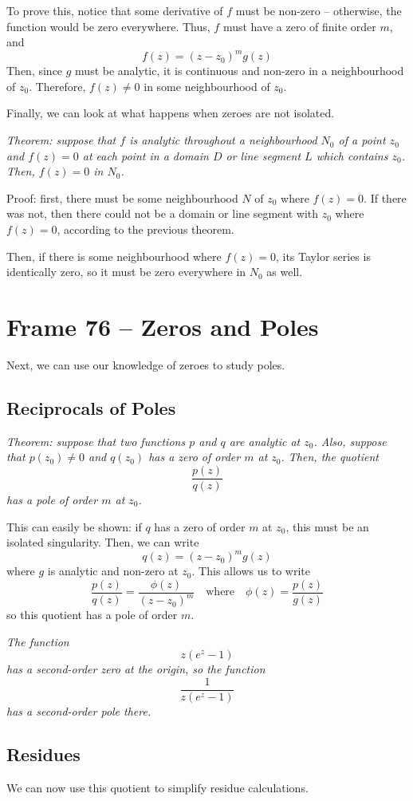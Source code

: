 \documentclass{article}
\begin{document}
To prove this, notice that some derivative of $f$ must be non-zero -- otherwise, the function would be zero everywhere. Thus, $f$ must have a zero of finite order $m$, and
\[	
	f(z) = (z - z_0)^m g(z)
\]
Then, since $g$ must be analytic, it is continuous and non-zero in a neighbourhood of $z_0$. Therefore, $f(z) \neq 0$ in some neighbourhood of $z_0$.

Finally, we can look at what happens when zeroes are not isolated.

\textit{Theorem: suppose that $f$ is analytic throughout a neighbourhood $N_0$ of a point $z_0$ and $f(z) = 0$ at each point in a domain $D$ or line segment $L$ which contains $z_0$. Then, $f(z) = 0$ in $N_0$.}

Proof: first, there must be some neighbourhood $N$ of $z_0$ where $f(z) = 0$. If there was not, then there could not be a domain or line segment with $z_0$ where $f(z) = 0$, according to the previous theorem.

Then, if there is some neighbourhood where $f(z) = 0$, its Taylor series is identically zero, so it must be zero everywhere in $N_0$ as well.


\clearpage
\section{Frame 76 -- Zeros and Poles}
Next, we can use our knowledge of zeroes to study poles.

\subsection{Reciprocals of Poles}
\textit{Theorem: suppose that two functions $p$ and $q$ are analytic at $z_0$. Also, suppose that $p(z_0) \neq 0$ and $q(z_0)$ has a zero of order $m$ at $z_0$. Then, the quotient
\[
	\frac{p(z)}{q(z)}
\]
has a pole of order $m$ at $z_0$.}

This can easily be shown: if $q$ has a zero of order $m$ at $z_0$, this must be an isolated singularity. Then, we can write
\[
	q(z) = (z - z_0)^m g(z)
\]
where $g$ is analytic and non-zero at $z_0$. This allows us to write
\[
	\frac{p(z)}{q(z)} = \frac{\phi(z)}{(z - z_0)^m}
	\quad \text{where} \quad
	\phi(z) = \frac{p(z)}{g(z)}
\]
so this quotient has a pole of order $m$.

\textit{The function
\[
	z(e^z - 1)
\]
has a second-order zero at the origin, so the function
\[
	\frac{1}{z(e^z - 1)}
\]
has a second-order pole there.}

\subsection{Residues}
We can now use this quotient to simplify residue calculations.
\end{document}
